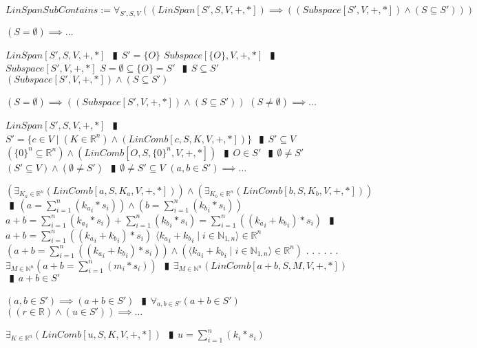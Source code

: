 \documentclass{book}
\newcommand{\abr}{:=}
\newcommand{\cont}{\phantom{.}. . .\phantom{.}}
\newcommand{\pipe}{$\phantom{(}\vrectangleblack\phantom{)}$}
\newcommand{\st}{\mathbin{|}}
\begin{document}
\begin{shaded} %
  $LinSpanSubContains \abr \forall_{S', S, V}((LinSpan[S', S, V, +, *]) \implies ((Subspace[S', V, +, *]) \land (S \subseteq S')))$
  \begin{enumerate}
    \lit $(S = \emptyset) \implies \ldots$
    \begin{enumerate}
      \lit $LinSpan[S', S, V, +, *]$ \pipe $S' = \{O\}$
      \lit $Subspace[\{O\}, V, +, *]$ \pipe $Subspace[S', V, +, *]$
      \lit $S = \emptyset \subseteq \{O\} = S'$ \pipe $S \subseteq S'$
      \lit $(Subspace[S', V, +, *]) \land (S \subseteq S')$
    \end{enumerate}
    \lit $(S = \emptyset) \implies ((Subspace[S', V, +, *]) \land (S \subseteq S'))$
    \lit $(S \neq \emptyset) \implies \ldots$
    \begin{enumerate}
      \lit $LinSpan[S', S, V, +, *]$ \pipe $S' = \{c \in V \st (K \in \mathbb{R}^n) \land (LinComb[c, S, K, V, +, *])\}$ \pipe $S' \subseteq V$
      \lit $(\{0\}^n \subseteq \mathbb{R}^n) \land (LinComb[O, S, \{0\}^n, V, +, *])$ \pipe $O \in S'$ \pipe $\emptyset \neq S'$
      \lit $(S' \subseteq V) \land (\emptyset \neq S')$ \pipe $\emptyset \neq S' \subseteq V$
      \lit $(a, b \in S') \implies \ldots$
      \begin{enumerate}
        \lit $(\exists_{K_a \in \mathbb{R}^n}(LinComb[a, S, K_a, V, +, *])) \land (\exists_{K_b \in \mathbb{R}^n}(LinComb[b, S, K_b, V, +, *]))$ \pipe $(a = \sum_{i = 1}^{n}({k_a}_i * s_i)) \land (b = \sum_{i = 1}^{n}({k_b}_i * s_i))$
        \lit $a + b = \sum_{i = 1}^{n}({k_a}_i * s_i) + \sum_{i = 1}^{n}({k_b}_i * s_i) = \sum_{i = 1}^{n}(({k_a}_i + {k_b}_i) * s_i)$ \pipe $a + b = \sum_{i = 1}^{n}(({k_a}_i + {k_b}_i) * s_i)$
        \lit $\langle {k_a}_i + {k_b}_i \st i \in \mathbb{N}_{1, n} \rangle \in \mathbb{R}^n$
        \lit $(a + b = \sum_{i = 1}^{n}(({k_a}_i + {k_b}_i) * s_i)) \land (\langle {k_a}_i + {k_b}_i \st i \in \mathbb{N}_{1, n} \rangle \in \mathbb{R}^n)$ \cont
        \lit \cont $\exists_{M \in \mathbb{N}^n}(a + b = \sum_{i = 1}^{n}(m_i * s_i))$ \pipe $\exists_{M \in \mathbb{N}^n}(LinComb[a + b, S, M, V, +, *])$ \pipe $a + b \in S'$
      \end{enumerate}
      \lit $(a, b \in S') \implies (a + b \in S')$ \pipe $\forall_{a, b \in S'}(a + b \in S')$
      \lit $((r \in \mathbb{R}) \land (u \in S')) \implies \ldots$
      \begin{enumerate}
        \lit $\exists_{K \in \mathbb{R}^n}(LinComb[u, S, K, V, +, *])$ \pipe $u = \sum_{i = 1}^{n}(k_i * s_i)$

\end{enumerate}
\end{enumerate}
\end{enumerate}
\end{shaded}
\end{document}
